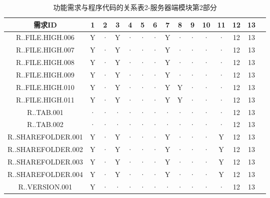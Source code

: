 \begin{table}[htbp]
\centering
\caption{功能需求与程序代码的关系表2-服务器端模块第2部分} \label{tab:requirement-module}
\begin{tabular}{|c|c|c|c|c|c|c|c|c|c|c|c|c|c|c|}
    \hline 
    需求ID & 1 & 2 & 3 & 4 & 5 & 6 & 7 & 8 & 9 & 10 & 11 &12&13\\    
    \hline 
    R..FILE.HIGH.006 &Y&· &Y&· &· &· &Y&· &· &· &· &12&13\\
    \hline
    R..FILE.HIGH.007 &Y&· &Y&· &· &· &Y&· &· &· &· &12&13\\
    \hline 
    R..FILE.HIGH.008 &Y&· &Y&· &· &· &Y&· &· &· &· &12&13\\
    \hline
    R..FILE.HIGH.009 &Y&· &Y&· &· &· &Y&· &· &· &· &12&13\\
    \hline
    R..FILE.HIGH.010 &Y&· &Y&· &· &· &Y&Y&· &· &· &12&13\\
    \hline
    R..FILE.HIGH.011 &Y&· &Y&· &· &· &Y&Y&· &· &· &12&13\\
    \hline
    R..TAB.001 &· &· &· &· &· &· &· &· &· &· &· &12&13\\
    \hline 
    R..TAB.002 &· &· &· &· &· &· &· &· &· &· &· &12&13\\
    \hline
    R..SHAREFOLDER.001 &Y&· &Y&· &· &· &Y&· &· &· &Y&12&13\\
    \hline
    R..SHAREFOLDER.002 &Y&· &Y&· &· &· &Y&· &· &· &Y&12&13\\
    \hline
    R..SHAREFOLDER.003 &Y&· &Y&· &· &· &Y&· &· &· &Y&12&13\\ 
    \hline
    R..SHAREFOLDER.004 &Y&· &Y&· &· &· &Y&· &· &· &Y&12&13\\ 
    \hline
    R..VERSION.001 &Y&· &· &· &· &· &· &· &· &· &· &12&13\\
    \hline
\end{tabular}
\end{table}
 